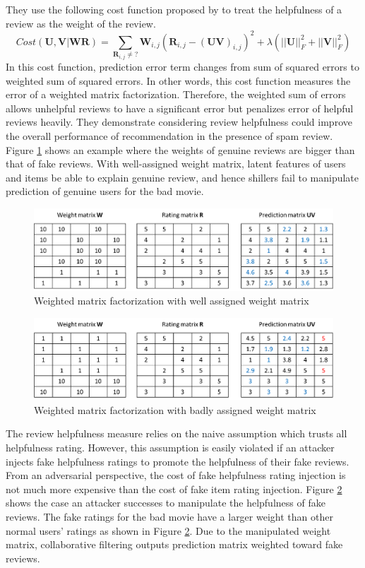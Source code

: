 \documentclass[master,english,final]{kaist-ucs}
\begin{document}
They use the following cost function proposed by \cite{ImplicitCF} to treat the helpfulness of a review as the weight of the review.
\begin{equation}
Cost(\bm{U},\bm{V} | \bm{W} \bm{R})=\sum_{\bm{R}_{i,j} \neq ?} \bm{W}_{i,j}(  \bm{R}_{i,j} - (\bm{UV})_{i,j} )^2 + \lambda(||\bm{U}||_F^2+||\bm{V}||_F^2)
\end{equation}
In this cost function, prediction error term changes from sum of squared errors to weighted sum of squared errors.
In other words, this cost function measures the error of a weighted matrix factorization.
Therefore, the weighted sum of errors allows unhelpful reviews to have a significant error but penalizes error of helpful reviews heavily.
They demonstrate considering review helpfulness could improve the overall performance of recommendation in the presence of spam review.
Figure \ref{wmf_good} shows an example where the weights of genuine reviews are bigger than that of fake reviews.
With well-assigned weight matrix, latent features of users and items be able to explain genuine review, and hence shillers fail to manipulate prediction of genuine users for the bad movie.

\begin{figure}[t]
    \centerline{\includegraphics[width=12.5cm]{figure/wmf_good}}
    \caption{  Weighted matrix factorization with well assigned weight matrix  } \label{wmf_good}
\end{figure}

\begin{figure}[t]
    \centerline{\includegraphics[width=12.5cm]{figure/wmf_bad}}
    \caption{  Weighted matrix factorization with badly assigned weight matrix  } \label{wmf_bad}
\end{figure}

The review helpfulness measure relies on the naive assumption which trusts all helpfulness rating.
However, this assumption is easily violated if an attacker injects fake helpfulness ratings to promote the helpfulness of their fake reviews.
From an adversarial perspective, the cost of fake helpfulness rating injection is not much more expensive than the cost of fake item rating injection.
Figure \ref{wmf_bad} shows the case an attacker successes to manipulate the helpfulness of fake reviews.
The fake ratings for the bad movie have a larger weight than other normal users' ratings as shown in Figure \ref{wmf_bad}.
Due to the manipulated weight matrix, collaborative filtering outputs prediction matrix weighted toward fake reviews.
\end{document}
